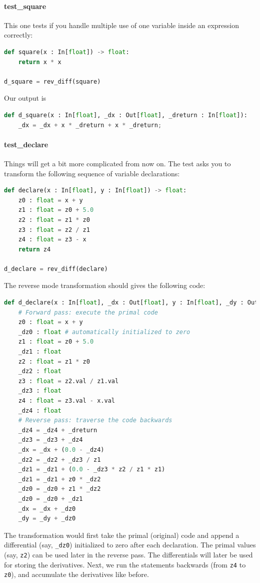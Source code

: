 \paragraph{test_square} This one tests if you handle multiple use of one variable inside an expression correctly:
\begin{lstlisting}[language=Python]
def square(x : In[float]) -> float:
    return x * x

d_square = rev_diff(square)
\end{lstlisting}
Our output is
\begin{lstlisting}[language=Python]
def d_square(x : In[float], _dx : Out[float], _dreturn : In[float]):
	_dx = _dx + x * _dreturn + x * _dreturn;
\end{lstlisting}

\paragraph{test_declare} Things will get a bit more complicated from now on. The test asks you to transform the following sequence of variable declarations:
\begin{lstlisting}[language=Python]
def declare(x : In[float], y : In[float]) -> float:
    z0 : float = x + y
    z1 : float = z0 + 5.0
    z2 : float = z1 * z0
    z3 : float = z2 / z1
    z4 : float = z3 - x
    return z4

d_declare = rev_diff(declare)
\end{lstlisting}
The reverse mode transformation should gives the following code:
\begin{lstlisting}[language=Python]
def d_declare(x : In[float], _dx : Out[float], y : In[float], _dy : Out[float], _dreturn : In[float]):
	# Forward pass: execute the primal code
	z0 : float = x + y
	_dz0 : float # automatically initialized to zero
	z1 : float = z0 + 5.0
	_dz1 : float
	z2 : float = z1 * z0
	_dz2 : float
	z3 : float = z2.val / z1.val
	_dz3 : float
	z4 : float = z3.val - x.val
	_dz4 : float
	# Reverse pass: traverse the code backwards
	_dz4 = _dz4 + _dreturn
	_dz3 = _dz3 + _dz4
	_dx = _dx + (0.0 - _dz4)
	_dz2 = _dz2 + _dz3 / z1
	_dz1 = _dz1 + (0.0 - _dz3 * z2 / z1 * z1)
	_dz1 = _dz1 + z0 * _dz2
	_dz0 = _dz0 + z1 * _dz2
	_dz0 = _dz0 + _dz1
	_dx = _dx + _dz0
	_dy = _dy + _dz0
\end{lstlisting}

The transformation would first take the primal (original) code and append a differential (say, \lstinline{_dz0}) initialized to zero after each declaration. The primal values (say, \lstinline{z2}) can be used later in the reverse pass. The differentials will later be used for storing the derivatives. Next, we run the statements backwards (from \lstinline{z4} to \lstinline{z0}), and accumulate the derivatives like before.

